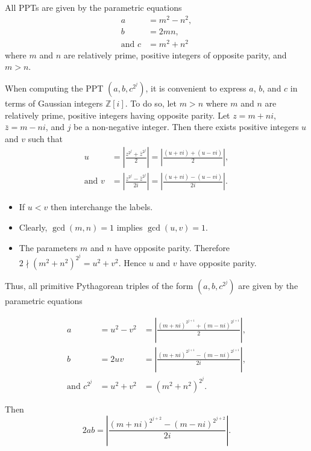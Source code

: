 \documentclass{article}
\theoremstyle{definition}
\begin{document}
All PPTs are given by the parametric equations
\begin{equation}
\begin{aligned}
a &= m^2 - n^2, \\
b &= 2mn, \\
\text{and } c &= m^2 + n^2
\end{aligned}
\end{equation}
where \(m\) and \(n\) are relatively prime, positive integers of opposite parity, and \(m > n\).

When computing the PPT \((a,b,c^{2^j})\), it is convenient to express \(a\), \(b\), and \(c\) in terms of Gaussian integers \(\mathbb{Z}[i]\). To do so, let \(m > n\) where \(m\) and \(n\) are relatively prime, positive integers having opposite parity. Let \(z=m+ni\),  \(\bar{z}=m-ni\), and \(j\) be a non-negative integer. Then there exists positive integers \(u\) and \(v\) such that \[\begin{aligned} u &= \left\lvert \frac{z^{2^j}+\bar{z}^{2^j}}{2} \right\rvert = \left\lvert\frac{(u+vi)+(u-vi)}{2}\right\rvert, \\ \text{and } v &= \left\lvert\frac{z^{2^j}-\bar{z}^{2^j}}{2i}\right\rvert = \left\lvert\frac{(u+vi)-(u-vi)}{2i}\right\rvert. \end{aligned}\]

\begin{itemize}
\item If \(u < v\) then interchange the labels.
\item Clearly, \(\gcd(m,n)=1\) implies \(\gcd(u,v)=1\).
\item The parameters \(m\) and \(n\) have opposite parity. Therefore \( 2\nmid (m^2+n^2)^{2^j} = u^2+v^2\). Hence \(u\) and \(v\) have opposite parity.
\end{itemize}

Thus, all primitive Pythagorean triples of the form  \((a,b,c^{2^j})\) are given by the parametric equations

\begin{align}
a &= u^2-v^2 &= \left\lvert \frac{(m+ni)^{2^{j+1}}+(m-ni)^{2^{j+1}}}{2} \right\rvert, \\
b &= 2uv &= \left\lvert \frac{(m+ni)^{2^{j+1}}-(m-ni)^{2^{j+1}}}{2i} \right\rvert, \\
\text{and } c^{2^j} &= u^2+v^2 &= (m^2+n^2)^{2^j}.
\end{align}

Then
\begin{equation}
2ab = \left\lvert \frac{(m+ni)^{2^{j+2}}-(m-ni)^{2^{j+2}}}{2i} \right\rvert.
\label{eq:hypotenuse}
\end{equation}
\end{document}
